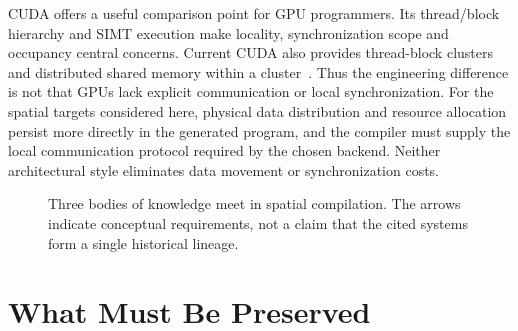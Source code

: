\documentclass[final,3p,times,authoryear]{elsarticle}
\providecommand{\Description}[1]{}
\begin{document}
CUDA offers a useful comparison point for GPU programmers. Its thread/block hierarchy and SIMT execution make locality, synchronization scope and occupancy central concerns. Current CUDA also provides thread-block clusters and distributed shared memory within a cluster~\citep{cuda2026}. Thus the engineering difference is not that GPUs lack explicit communication or local synchronization. For the spatial targets considered here, physical data distribution and resource allocation persist more directly in the generated program, and the compiler must supply the local communication protocol required by the chosen backend. Neither architectural style eliminates data movement or synchronization costs.

\begin{figure}[t]
\centering
{}
\caption{Three bodies of knowledge meet in spatial compilation. The arrows indicate conceptual requirements, not a claim that the cited systems form a single historical lineage.}
\Description{Three boxes for process semantics, spatial algorithm structure, and implementation semantics feed a box for spatial compilation.}
\label{fig:background}
\end{figure}

\section{What Must Be Preserved}\label{sec:semantics}
\end{document}
